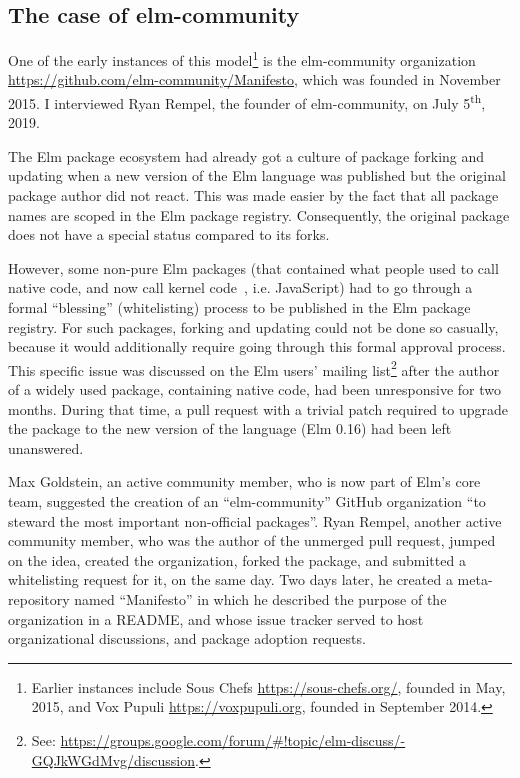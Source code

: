 \subsection{The case of elm-community}

One of the early instances of this model\footnote{
	Earlier instances include Sous Chefs \url{https://sous-chefs.org/}, founded in May, 2015, and Vox Pupuli \url{https://voxpupuli.org}, founded in September 2014.
} is the elm-community organization \url{https://github.com/elm-community/Manifesto}, which was founded in November 2015.
I interviewed Ryan Rempel, the founder of elm-community, on July 5\textsuperscript{th}, 2019.

The Elm package ecosystem had already got a culture of package forking and updating when a new version of the Elm language was published but the original package author did not react.
This was made easier by the fact that all package names are scoped in the Elm package registry.
Consequently, the original package does not have a special status compared to its forks.

However, some non-pure Elm packages (that contained what people used to call native code, and now call kernel code~\cite{czaplicki2018native}, i.e. JavaScript) had to go through a formal ``blessing'' (whitelisting) process to be published in the Elm package registry.
For such packages, forking and updating could not be done so casually, because it would additionally require going through this formal approval process.
This specific issue was discussed on the Elm users' mailing list\footnote{
	See: \url{https://groups.google.com/forum/\#!topic/elm-discuss/-GQJkWGdMvg/discussion}.
} after the author of a widely used package, containing native code, had been unresponsive for two months.
During that time, a pull request with a trivial patch required to upgrade the package to the new version of the language (Elm 0.16) had been left unanswered.

Max Goldstein, an active community member, who is now part of Elm's core team, suggested the creation of an ``elm-community'' GitHub organization ``to steward the most important non-official packages''.
Ryan Rempel, another active community member, who was the author of the unmerged pull request, jumped on the idea, created the organization, forked the package, and submitted a whitelisting request for it, on the same day.
Two days later, he created a meta-repository named ``Manifesto'' in which he described the purpose of the organization in a README, and whose issue tracker served to host organizational discussions, and package adoption requests.

